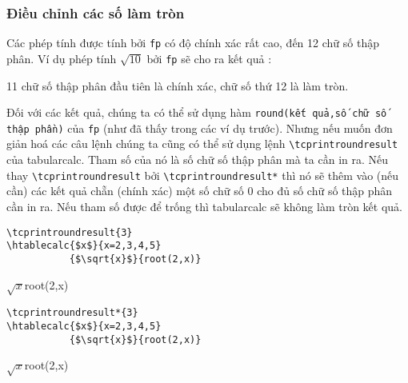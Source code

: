 \documentclass[a4paper,10pt]{article}
\newcommand\tbcalc{\textsf{tabularcalc}\xspace}
\newcommand\verbinline{\lstinline[breaklines=false,basicstyle=\normalsize\ttfamily]}
\begin{document}
\subsubsection{Điều chỉnh các số làm tròn}
Các phép tính được tính bởi \verb|fp| có độ chính xác rất cao, đến 12 chữ số thập phân. Ví dụ phép tính $\sqrt{10}$ bởi \verb=fp= sẽ cho ra kết quả :
\begin{center}\FPeval{}\numprint\truc\end{center}
11 chữ số thập phân đầu tiên là chính xác, chữ số thứ 12 là làm tròn.\medskip

Đối với các kết quả, chúng ta có thể sử dụng hàm \verb|round(kết quả,số chữ số thập phần)| của \verb|fp| (như đã thấy trong các ví dụ trước). Nhưng nếu muốn đơn giản hoá các câu lệnh chúng ta cũng có thể sử dụng lệnh \verbinline|\tcprintroundresult| của \tbcalc. Tham số của nó là số chữ số thập phân mà ta cần in ra. Nếu thay \verbinline|\tcprintroundresult| bởi \verbinline|\tcprintroundresult*| thì nó sẽ thêm vào (nếu cần) các kết quả chẵn (chính xác) một số chữ số 0 cho đủ số chữ số thập phân cần in ra. Nếu tham số được để trống thì \tbcalc sẽ không làm tròn kết quả.

\begin{center}
\begin{minipage}{0.5\linewidth}
\begin{center}
\begin{lstlisting}
\tcprintroundresult{3}
\htablecalc{$x$}{x=2,3,4,5}
           {$\sqrt{x}$}{root(2,x)}
\end{lstlisting}
           {$\sqrt{x}$}{root(2,x)}
\end{center}
\end{minipage}%
\begin{minipage}{0.5\linewidth}
\begin{center}
\begin{lstlisting}
\tcprintroundresult*{3}
\htablecalc{$x$}{x=2,3,4,5}
           {$\sqrt{x}$}{root(2,x)}
\end{lstlisting}
           {$\sqrt{x}$}{root(2,x)}
\end{center}
\end{minipage}
\end{center}
\end{document}
